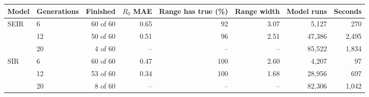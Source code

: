 \begin{tabular}{llrrrrrr}
\toprule
Model & Generations & Finished & $R_0$ MAE & Range has true (\%) & Range width & Model runs & Seconds \\
\midrule
SEIR & 6 & 60 of 60 & 0.65 & 92 & 3.07 & 5,127 & 270 \\
 & 12 & 50 of 60 & 0.51 & 96 & 2.51 & 47,386 & 2,495 \\
 & 20 & 4 of 60 & -- & -- & -- & 85,522 & 1,834 \\
\midrule
SIR & 6 & 60 of 60 & 0.47 & 100 & 2.60 & 4,207 & 97 \\
 & 12 & 53 of 60 & 0.34 & 100 & 1.68 & 28,956 & 697 \\
 & 20 & 8 of 60 & -- & -- & -- & 82,306 & 1,042 \\
\bottomrule
\end{tabular}
